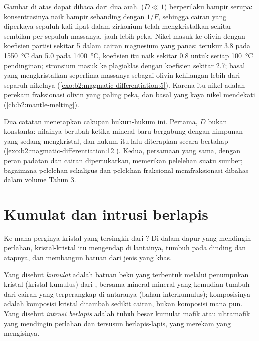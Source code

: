 Gambar di atas dapat dibaca dari dua arah.  ($D \ll 1$) berperilaku
hampir serupa: konsentrasinya naik hampir sebanding dengan $1/F$, sehingga cairan yang diperkaya
sepuluh kali lipat dalam zirkonium telah mengkristalkan sekitar sembilan per sepuluh massanya.  jauh lebih peka. Nikel masuk ke olivin dengan koefisien
partisi sekitar 5 dalam cairan magnesium yang panas: terukur 3.8 pada
\qty{1550}{\celsius} dan 5.0 pada \qty{1400}{\celsius}, koefisien itu naik sekitar 0.8 untuk setiap
\qty{100}{\celsius} pendinginan; stronsium masuk ke
plagioklas dengan koefisien sekitar 2.7; basal yang mengkristalkan seperlima massanya sebagai
olivin kehilangan lebih dari separuh nikelnya (\cref{exo:b2:magmatic-differentiation:5}). Karena itu nikel adalah
perekam fraksionasi olivin yang paling peka, dan basal yang kaya nikel
mendekati  (\cref{ch:b2:mantle-melting}).

Dua catatan menetapkan cakupan hukum-hukum ini. Pertama, $D$ bukan konstanta: nilainya berubah
ketika mineral baru bergabung dengan himpunan yang sedang mengkristal, dan hukum itu lalu diterapkan
secara bertahap (\cref{exo:b2:magmatic-differentiation:12}). Kedua, persamaan yang sama, dengan peran padatan dan
cairan dipertukarkan, memerikan pelelehan suatu sumber; bagaimana pelelehan sekaligus dan pelelehan
fraksional memfraksionasi  dibahas dalam volume Tahun 3.

\section{Kumulat dan intrusi berlapis}\label{sec:b2:magmatic-differentiation:cumulates}

Ke mana perginya kristal yang tersingkir dari ? Di dalam dapur  yang mendingin
perlahan, kristal-kristal itu mengendap di lantainya, tumbuh pada dinding dan atapnya, dan membangun batuan
dari jenis yang khas.

\begin{definition}\label{def:b2:magmatic-differentiation:cumulate}
Yang disebut \emph{kumulat} adalah batuan beku yang terbentuk melalui penumpukan
kristal (kristal kumulus) dari , bersama mineral-mineral yang kemudian tumbuh
dari cairan yang terperangkap di antaranya (bahan interkumulus); komposisinya
adalah komposisi kristal ditambah sedikit cairan, bukan komposisi  mana pun. Yang disebut \emph{intrusi
berlapis} adalah tubuh besar kumulat mafik atau
ultramafik yang mendingin perlahan dan tersusun berlapis-lapis, yang merekam 
 yang mengisinya.
\end{definition}

